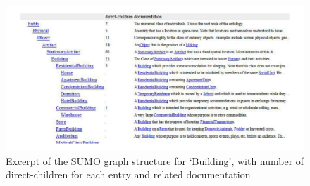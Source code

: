 \documentclass[11pt]{article}
\begin{document}


\begin{figure}[ht!]
\includegraphics[width=\textwidth]{building_SUMO1}
\caption{Excerpt of the SUMO graph structure for `Building', with number of direct-children for each entry and related documentation}\label{building_SUMO}
\end{figure}
\end{document}
